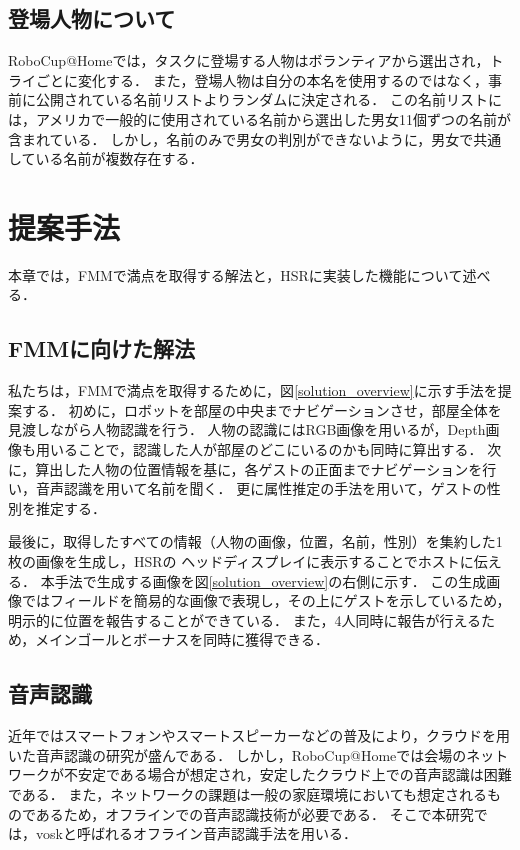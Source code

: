 \documentclass[a4j]{jarticle}
\begin{document}
\subsection{登場人物について}
\label{about_name_list}
RoboCup@Homeでは，タスクに登場する人物はボランティアから選出され，トライごとに変化する．
また，登場人物は自分の本名を使用するのではなく，事前に公開されている名前リストよりランダムに決定される．
この名前リストには，アメリカで一般的に使用されている名前から選出した男女11個ずつの名前が含まれている．
しかし，名前のみで男女の判別ができないように，男女で共通している名前が複数存在する．


\section{提案手法}
本章では，FMMで満点を取得する解法と，HSRに実装した機能について述べる．

\subsection{FMMに向けた解法}
私たちは，FMMで満点を取得するために，図\ref{solution_overview}に示す手法を提案する．
初めに，ロボットを部屋の中央までナビゲーションさせ，部屋全体を見渡しながら人物認識を行う．
人物の認識にはRGB画像を用いるが，Depth画像も用いることで，認識した人が部屋のどこにいるのかも同時に算出する．
次に，算出した人物の位置情報を基に，各ゲストの正面までナビゲーションを行い，音声認識を用いて名前を聞く．
更に属性推定の手法を用いて，ゲストの性別を推定する．

最後に，取得したすべての情報（人物の画像，位置，名前，性別）を集約した1枚の画像を生成し，HSRの
ヘッドディスプレイに表示することでホストに伝える．
本手法で生成する画像を図\ref{solution_overview}の右側に示す．
この生成画像ではフィールドを簡易的な画像で表現し，その上にゲストを示しているため，明示的に位置を報告することができている．
また，4人同時に報告が行えるため，メインゴールとボーナスを同時に獲得できる．

\subsection{音声認識}
近年ではスマートフォンやスマートスピーカーなどの普及により，クラウドを用いた音声認識の研究が盛んである\cite{google_speech_api, amazon_speech_api}．
しかし，RoboCup@Homeでは会場のネットワークが不安定である場合が想定され，安定したクラウド上での音声認識は困難である．
また，ネットワークの課題は一般の家庭環境においても想定されるものであるため，オフラインでの音声認識技術が必要である．
そこで本研究では，vosk\cite{vosk_hp}と呼ばれるオフライン音声認識手法を用いる．
\end{document}
